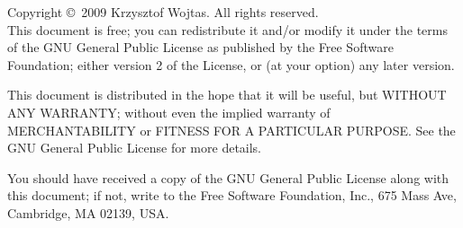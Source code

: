 \begingroup

	\def\hyperpageanchor#1{\hss}
	\makeatletter{}\makeatother
	\newlength{\centeroffset}
	\setlength{\centeroffset}{-0.5\oddsidemargin}
	\addtolength{\centeroffset}{0.5\evensidemargin}

	\begingroup
		\sffamily
		\thispagestyle{empty}

		\noindent\hspace*{\centeroffset}


		\noindent\hspace*{\centeroffset}

		\pagebreak
	\endgroup

	\begingroup
		\setlength{\parindent}{0pt}
		\setlength{\parskip}{1ex}

		\begingroup
			\TPSwitchToEnglish
			\begin{small}
				Copyright \copyright\ 2009 Krzysztof Wojtas. All rights reserved.\\
				
				This document is free; you can redistribute it and/or modify it under the terms of the GNU General Public License as published by the Free Software Foundation; either version 2 of the License, or (at your option) any later version.

				This document is distributed in the hope that it will be useful, but WITHOUT ANY WARRANTY; without even the implied warranty of MERCHANTABILITY or FITNESS FOR A PARTICULAR PURPOSE\@.  See the GNU General Public License for more details.

				You should have received a copy of the GNU General Public License along with this document; if not, write to the Free Software Foundation, Inc., 675 Mass Ave, Cambridge, MA 02139, USA.
			\end{small}
		\endgroup
		
